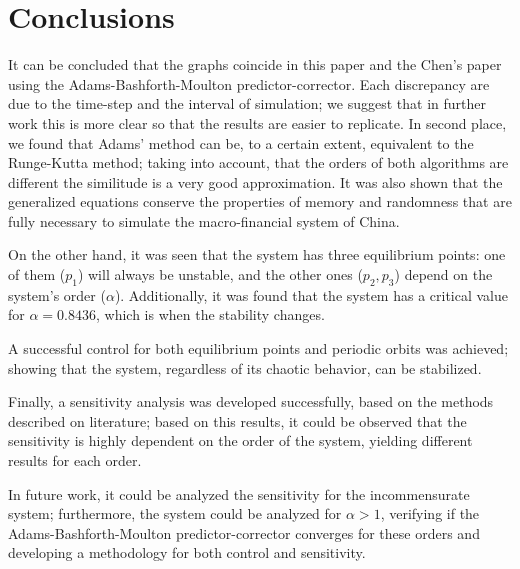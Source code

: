 \section{Conclusions}
It can be concluded that the graphs coincide in this paper and the Chen's paper using the Adams-Bashforth-Moulton predictor-corrector. Each discrepancy are due to the time-step and the interval of simulation; we suggest that in further work this is more clear so that the results are easier to replicate. In second place, we found that Adams' method can be, to a certain extent, equivalent to the Runge-Kutta method; taking into account, that the orders of both algorithms are different the similitude is a very good approximation. It was also shown that the generalized equations conserve the properties of memory and randomness that are fully necessary to simulate the macro-financial system of China. 

On the other hand, it was seen that the system has three equilibrium points: one of them ($p_1$) will always be unstable, and the other ones ($p_2,p_3$) depend on the system's order ($\alpha$). Additionally, it was found that the system has a critical value for $\alpha = 0.8436$, which is when the stability changes.

A successful control for both equilibrium points and periodic orbits was achieved; showing that the system, regardless of its chaotic behavior, can be stabilized.

Finally, a sensitivity analysis was developed successfully, based on the methods described on literature; based on this results, it could be observed that the sensitivity is highly dependent on the order of the system, yielding different results for each order.

In future work, it could be analyzed the sensitivity for the incommensurate system; furthermore, the system could be analyzed for $\alpha>1$, verifying if the Adams-Bashforth-Moulton predictor-corrector converges for these orders and developing a methodology for both control and sensitivity.








